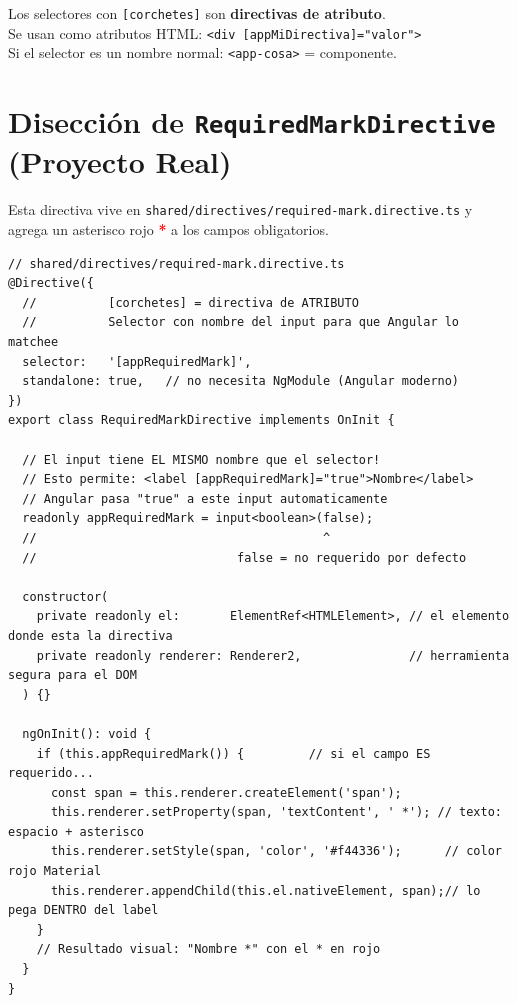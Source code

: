 \documentclass[12pt, a4paper]{article}
\begin{document}
\begin{tcolorbox}[importante, title={\emoji{light-bulb} \emoji{smiling-face-with-sunglasses} La Regla del Corchete}]
  Los selectores con \texttt{[corchetes]} son \textbf{directivas de atributo}.\\
  Se usan como atributos HTML: \texttt{<div [appMiDirectiva]="valor">}\\[0.3cm]
   Si el selector es un nombre normal: \texttt{<app-cosa>} = componente.
\end{tcolorbox}

\section{  Disección de \texttt{RequiredMarkDirective} (Proyecto Real)}

Esta directiva vive en \textcolor{morado}{\texttt{shared/directives/required-mark.directive.ts}}
y agrega un asterisco rojo \textcolor{red}{\textbf{*}} a los campos obligatorios.

\begin{lstlisting}
// shared/directives/required-mark.directive.ts
@Directive({
  //          [corchetes] = directiva de ATRIBUTO
  //          Selector con nombre del input para que Angular lo matchee
  selector:   '[appRequiredMark]',
  standalone: true,   // no necesita NgModule (Angular moderno)
})
export class RequiredMarkDirective implements OnInit {

  // El input tiene EL MISMO nombre que el selector!
  // Esto permite: <label [appRequiredMark]="true">Nombre</label>
  // Angular pasa "true" a este input automaticamente
  readonly appRequiredMark = input<boolean>(false);
  //                                        ^
  //                            false = no requerido por defecto

  constructor(
    private readonly el:       ElementRef<HTMLElement>, // el elemento donde esta la directiva
    private readonly renderer: Renderer2,               // herramienta segura para el DOM
  ) {}

  ngOnInit(): void {
    if (this.appRequiredMark()) {         // si el campo ES requerido...
      const span = this.renderer.createElement('span');
      this.renderer.setProperty(span, 'textContent', ' *'); // texto: espacio + asterisco
      this.renderer.setStyle(span, 'color', '#f44336');      // color rojo Material
      this.renderer.appendChild(this.el.nativeElement, span);// lo pega DENTRO del label
    }
    // Resultado visual: "Nombre *" con el * en rojo
  }
}
\end{lstlisting}
\end{document}
